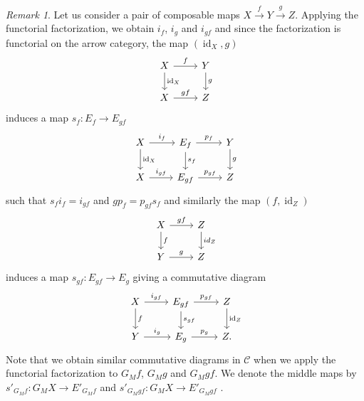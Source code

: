 \documentclass{article}
\newcommand{\cC}{\mathcal{C}}
\DeclareMathOperator{\id}{id}
\theoremstyle{definition}
\theoremstyle{remark}
\newtheorem{remark}[theorem]{Remark}
\begin{document}
\begin{remark} \label{rem:sepcompu}
Let us consider a pair of composable maps  $X \xrightarrow{f} Y \xrightarrow{g} Z$. Applying the functorial factorization, we obtain 
$i_{f}$, $i_{g}$ and $i_{gf}$ and since the factorization is functorial on the arrow category, the map $(\id_{X},g)$  
\[\begin{tikzcd}
        X \arrow{r}{f} \arrow{d}{\id_{X}}  & Y \arrow{d}{g} \\
        X \arrow{r}{gf} & Z
     \end{tikzcd}
     \]   
induces a map $s_{f}:E_{f} \rightarrow E_{gf}$ 
\[\begin{tikzcd}
        X \arrow{r}{i_{f}} \arrow{d}{\id_X}  & E_{f} \arrow{d}{s_{f}} \arrow{r}{p_{f}} & Y \arrow{d}{g}\\
        X \arrow{r}{i_{gf}} & E_{gf} \arrow{r}{p_{gf}} & Z
     \end{tikzcd}
     \]   
such that $s_{f}i_{f}=i_{gf}$ and $gp_{f}=p_{gf}s_{f}$ and similarly the map $(f,\id_{Z})$  
\[\begin{tikzcd}
        X \arrow{r}{gf} \arrow{d}{f}  & Z \arrow{d}{id_{Z}} \\
        Y \arrow{r}{g} & Z
     \end{tikzcd}
     \]  
     induces a map $s_{gf}:E_{gf} \rightarrow E_{g}$ giving a commutative diagram  
     \[\begin{tikzcd}
        X \arrow{r}{i_{gf}} \arrow{d}{f}  & E_{gf} \arrow{d}{s_{gf}} \arrow{r}{p_{gf}} & Z \arrow{d}{\id_{Z}}\\
        Y \arrow{r}{i_{g}} & E_{g} \arrow{r}{p_{g}} & Z.
     \end{tikzcd}
     \]
     Note that we obtain similar commutative diagrams in $\cC$ when we apply the functorial factorization to $G_{M}f$, 
     $G_{M}g$ and $G_{M}gf$. We denote the middle maps by $s'_{G_{M}f}:G_{M}X \rightarrow E'_{G_{M}f}$ 
     and $s'_{G_{M}gf}:G_{M}X \rightarrow E'_{G_{M}gf}$ .
     

\end{remark}
\end{document}
